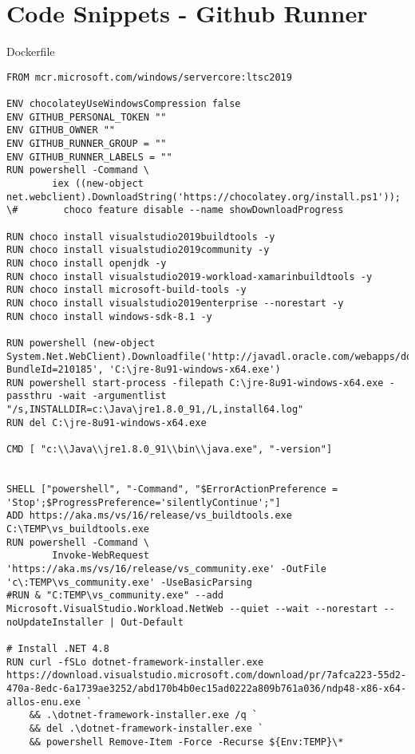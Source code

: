 \chapter{Code Snippets - Github Runner} 
\label{AppendixB} 


Dockerfile
\begin{lstlisting}[breaklines]
FROM mcr.microsoft.com/windows/servercore:ltsc2019

ENV chocolateyUseWindowsCompression false
ENV GITHUB_PERSONAL_TOKEN ""
ENV GITHUB_OWNER ""
ENV GITHUB_RUNNER_GROUP = ""
ENV GITHUB_RUNNER_LABELS = ""
RUN powershell -Command \
        iex ((new-object net.webclient).DownloadString('https://chocolatey.org/install.ps1')); \#        choco feature disable --name showDownloadProgress

RUN choco install visualstudio2019buildtools -y
RUN choco install visualstudio2019community -y
RUN choco install openjdk -y
RUN choco install visualstudio2019-workload-xamarinbuildtools -y
RUN choco install microsoft-build-tools -y
RUN choco install visualstudio2019enterprise --norestart -y 
RUN choco install windows-sdk-8.1 -y

RUN powershell (new-object System.Net.WebClient).Downloadfile('http://javadl.oracle.com/webapps/download/AutoDL?BundleId=210185', 'C:\jre-8u91-windows-x64.exe')
RUN powershell start-process -filepath C:\jre-8u91-windows-x64.exe -passthru -wait -argumentlist "/s,INSTALLDIR=c:\Java\jre1.8.0_91,/L,install64.log"
RUN del C:\jre-8u91-windows-x64.exe

CMD [ "c:\\Java\\jre1.8.0_91\\bin\\java.exe", "-version"]


SHELL ["powershell", "-Command", "$ErrorActionPreference = 'Stop';$ProgressPreference='silentlyContinue';"]
ADD https://aka.ms/vs/16/release/vs_buildtools.exe C:\TEMP\vs_buildtools.exe
RUN powershell -Command \
        Invoke-WebRequest 'https://aka.ms/vs/16/release/vs_community.exe' -OutFile 'c\:TEMP\vs_community.exe' -UseBasicParsing
#RUN & "C:TEMP\vs_community.exe" --add Microsoft.VisualStudio.Workload.NetWeb --quiet --wait --norestart --noUpdateInstaller | Out-Default

# Install .NET 4.8
RUN curl -fSLo dotnet-framework-installer.exe https://download.visualstudio.microsoft.com/download/pr/7afca223-55d2-470a-8edc-6a1739ae3252/abd170b4b0ec15ad0222a809b761a036/ndp48-x86-x64-allos-enu.exe `
    && .\dotnet-framework-installer.exe /q `
    && del .\dotnet-framework-installer.exe `
    && powershell Remove-Item -Force -Recurse ${Env:TEMP}\*


\end{lstlisting}
